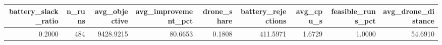 \begin{tabular}{rrrrrrrrr}
\toprule
battery_slack_ratio & n_runs & avg_objective & avg_improvement_pct & drone_share & battery_rejections & avg_cpu_s & feasible_runs_pct & avg_drone_distance \\
\midrule
0.2000 & 484 & 9428.9215 & 80.6653 & 0.1808 & 411.5971 & 1.6729 & 1.0000 & 54.6910 \\
\bottomrule
\end{tabular}
